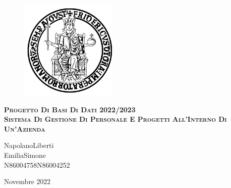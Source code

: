 \documentclass{report}
\begin{document}
    \begin{figure}[htbp!]
        \begin{center}
            \includegraphics[width=.25\textwidth]{Immagini/FedericoII.png}
        \end{center}
    \end{figure}
\begin{center}
    {\scshape\Large\bfseries\center  Progetto Di Basi Di Dati 2022/2023 \\ Sistema Di Gestione Di Personale E Progetti All’Interno Di Un’Azienda }
\end{center}
\vfill
    \begin{center}
	Napolano\tab								Liberti	\\
	Emilia\tab									Simone	\\
	N86004758\tab								N86004252 \\
		\begin{center}
			  Novembre 2022
		\end{center}			
    \end{center}
    \newpage
    
    \tableofcontents
    
    
    
    
    
\end{document}
